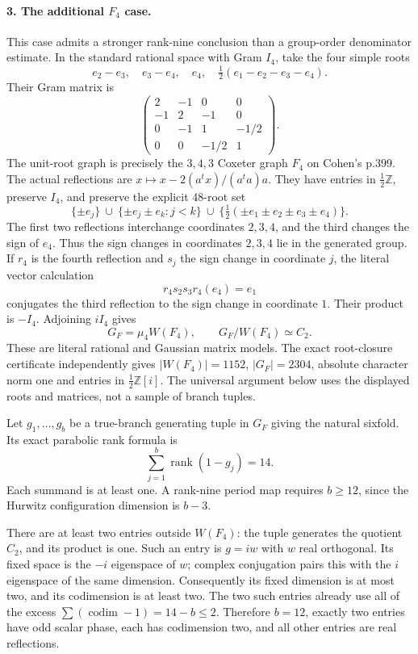 \paragraph{3. The additional \(F_4\) case.}
This case admits a stronger rank-nine conclusion than a
group-order denominator estimate. In the standard rational
space with Gram \(I_4\), take the four simple roots
\[
 e_2-e_3,\quad e_3-e_4,\quad e_4,\quad
                \tfrac12(e_1-e_2-e_3-e_4).
\]
Their Gram matrix is
\[
 \begin{pmatrix}
 2&-1&0&0\\-1&2&-1&0\\0&-1&1&-1/2\\0&0&-1/2&1
 \end{pmatrix}.
                                                            \tag{G25.4}
\]
The unit-root graph is precisely the \(3,4,3\) Coxeter
graph \(F_4\) on Cohen's p.399. The actual reflections are
\(x\mapsto x-2(a^tx)/(a^ta)a\).
They have entries in \(\tfrac12\mathbb Z\), preserve \(I_4\),
and preserve the explicit 48-root set
\[
 \{\pm e_j\}\ \cup\
 \{\pm e_j\pm e_k:j<k\}\ \cup\
 \{\tfrac12(\pm e_1\pm e_2\pm e_3\pm e_4)\}.
\]
The first two reflections interchange coordinates \(2,3,4\),
and the third changes the sign of \(e_4\). Thus the sign
changes in coordinates \(2,3,4\) lie in the generated group.
If \(r_4\) is the fourth reflection and \(s_j\) the sign
change in coordinate \(j\), the literal vector calculation
\[
                  r_4s_2s_3r_4(e_4)=e_1
\]
conjugates the third reflection to the sign change in
coordinate \(1\). Their product is \(-I_4\).
Adjoining \(iI_4\) gives
\[
                  G_F=\mu_4W(F_4),\qquad G_F/W(F_4)\simeq C_2.
\]
These are literal rational and Gaussian matrix models.
The exact root-closure certificate independently gives
\(|W(F_4)|=1152\), \(|G_F|=2304\), absolute character
norm one and entries in \(\tfrac12\mathbb Z[i]\).
The universal argument below uses the displayed roots and
matrices, not a sample of branch tuples.

Let \(g_1,\ldots,g_b\) be a true-branch generating tuple in
\(G_F\) giving the natural sixfold. Its exact parabolic rank
formula is
\[
              \sum_{j=1}^b\operatorname{rank}(1-g_j)=14.
                                                            \tag{G25.5}
\]
Each summand is at least one. A rank-nine period map requires
\(b\ge12\), since the Hurwitz configuration dimension is \(b-3\).

There are at least two entries outside \(W(F_4)\): the
tuple generates the quotient \(C_2\), and its product is
one. Such an entry is \(g=iw\) with \(w\) real orthogonal.
Its fixed space is the \(-i\) eigenspace of \(w\); complex
conjugation pairs this with the \(i\) eigenspace of the
same dimension. Consequently its fixed dimension is at
most two, and its codimension is at least two. The two
such entries already use all of the excess
\(\sum(\operatorname{codim}-1)=14-b\le2\).
Therefore \(b=12\), exactly two entries have odd scalar
phase, each has codimension two, and all other entries
are real reflections.


